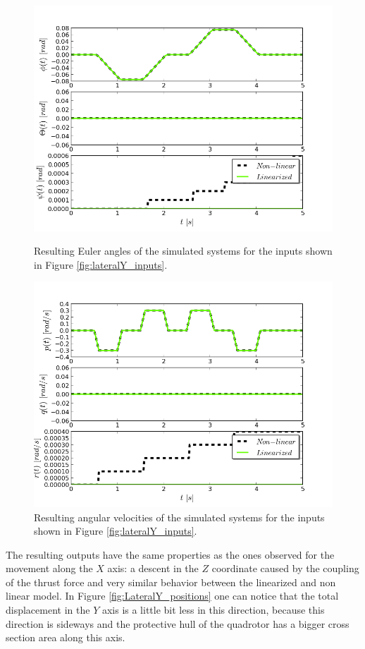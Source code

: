\begin{figure}[h!]
\centering
\includegraphics[scale=0.7]{Images/Chapter3/Lateral_Y/Euler_Angles.png}
\caption{Resulting Euler angles of the simulated systems for the inputs shown in Figure \ref{fig:lateralY_inputs}.}
\label{fig:LateralY_Euler}

\includegraphics[scale=0.7]{Images/Chapter3/Lateral_Y/Angular_velocities.png}
\caption{Resulting angular velocities of the simulated systems for the inputs shown in Figure \ref{fig:lateralY_inputs}.}
\label{fig:LateralY_angvelocities}
\end{figure}

The resulting outputs have the same properties as the ones observed for the movement along the $X$ axis: a descent in the $Z$ coordinate caused by the coupling of the thrust force and very similar behavior between the linearized and non linear model. In Figure \ref{fig:LateralY_positions} one can notice that the total displacement in the $Y$ axis is a little bit less in this direction, because this direction is sideways and the protective hull of the quadrotor has a bigger cross section area along this axis. 

